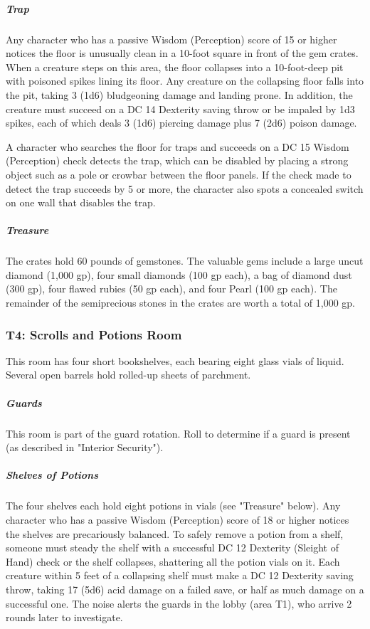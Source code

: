 \documentclass[10pt,a4paper,twoside,bg=print,twocolumn,openany,nodeprecatedcode]{dndbook}
\begin{document}
\subparagraph{Trap}
Any character who has a passive Wisdom (Perception) score of 15 or higher notices the floor is unusually clean in a 10-foot square in front of the gem crates. When a creature steps on this area, the floor collapses into a 10-foot-deep pit with poisoned spikes lining its floor. Any creature on the collapsing floor falls into the pit, taking 3 (1d6) bludgeoning damage and landing prone. In addition, the creature must succeed on a DC 14 Dexterity saving throw or be impaled by 1d3 spikes, each of which deals 3 (1d6) piercing damage plus 7 (2d6) poison damage.

A character who searches the floor for traps and succeeds on a DC 15 Wisdom (Perception) check detects the trap, which can be disabled by placing a strong object such as a pole or crowbar between the floor panels. If the check made to detect the trap succeeds by 5 or more, the character also spots a concealed switch on one wall that disables the trap.

\subparagraph{Treasure}
The crates hold 60 pounds of gemstones. The valuable gems include a large uncut diamond (1,000 gp), four small diamonds (100 gp each), a bag of diamond dust (300 gp), four flawed rubies (50 gp each), and four Pearl (100 gp each). The remainder of the semiprecious stones in the crates are worth a total of 1,000 gp.

\subsubsection{T4: Scrolls and Potions Room}
\begin{DndReadAloud}{}
This room has four short bookshelves, each bearing eight glass vials of liquid. Several open barrels hold rolled-up sheets of parchment.

\end{DndReadAloud}

\subparagraph{Guards}
This room is part of the guard rotation. Roll to determine if a guard is present (as described in "Interior Security").

\subparagraph{Shelves of Potions}
The four shelves each hold eight potions in vials (see "Treasure" below). Any character who has a passive Wisdom (Perception) score of 18 or higher notices the shelves are precariously balanced. To safely remove a potion from a shelf, someone must steady the shelf with a successful DC 12 Dexterity (Sleight of Hand) check or the shelf collapses, shattering all the potion vials on it. Each creature within 5 feet of a collapsing shelf must make a DC 12 Dexterity saving throw, taking 17 (5d6) acid damage on a failed save, or half as much damage on a successful one. The noise alerts the guards in the lobby (area T1), who arrive 2 rounds later to investigate.
\end{document}

